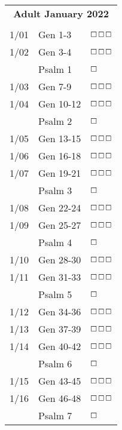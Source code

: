 \documentclass[10pt,landscape,letterpaper]{article}
\begin{document}
\begin{multicols}{5}
\begin{tabular}{p{0.15in}p{0.7in}p{0.5in}}
\multicolumn{3}{c}{\textbf{Adult January 2022}} \\
& & \\
1/01 & Gen 1-3 & $\boxempty$$\boxempty$$\boxempty$ \\
1/02 & Gen 3-4 & $\boxempty$$\boxempty$$\boxempty$ \\
 & \textcolor[rgb]{0.98,0.00,0.00}{Psalm 1} & \textcolor[rgb]{1.00,0.00,0.00}{$\boxempty$} \\
1/03 & Gen 7-9 & $\boxempty$$\boxempty$$\boxempty$ \\
1/04 & Gen 10-12 & $\boxempty$$\boxempty$$\boxempty$ \\
 & \textcolor[rgb]{0.98,0.00,0.00}{Psalm 2} & \textcolor[rgb]{1.00,0.00,0.00}{$\boxempty$} \\
1/05 & Gen 13-15 & $\boxempty$$\boxempty$$\boxempty$ \\
1/06 & Gen 16-18 & $\boxempty$$\boxempty$$\boxempty$ \\
1/07 & Gen 19-21 & $\boxempty$$\boxempty$$\boxempty$ \\
 & \textcolor[rgb]{0.98,0.00,0.00}{Psalm 3} & \textcolor[rgb]{1.00,0.00,0.00}{$\boxempty$} \\
1/08 & Gen 22-24 & $\boxempty$$\boxempty$$\boxempty$ \\
1/09 & Gen 25-27 & $\boxempty$$\boxempty$$\boxempty$ \\
 & \textcolor[rgb]{0.98,0.00,0.00}{Psalm 4} & \textcolor[rgb]{1.00,0.00,0.00}{$\boxempty$} \\
1/10 & Gen 28-30 & $\boxempty$$\boxempty$$\boxempty$ \\
1/11 & Gen 31-33 & $\boxempty$$\boxempty$$\boxempty$ \\
 & \textcolor[rgb]{0.98,0.00,0.00}{Psalm 5} & \textcolor[rgb]{1.00,0.00,0.00}{$\boxempty$} \\
1/12 & Gen 34-36 & $\boxempty$$\boxempty$$\boxempty$ \\
1/13 & Gen 37-39 & $\boxempty$$\boxempty$$\boxempty$ \\
1/14 & Gen 40-42 & $\boxempty$$\boxempty$$\boxempty$ \\
 & \textcolor[rgb]{0.98,0.00,0.00}{Psalm 6} & \textcolor[rgb]{1.00,0.00,0.00}{$\boxempty$} \\
1/15 & Gen 43-45 & $\boxempty$$\boxempty$$\boxempty$ \\
1/16 & Gen 46-48 & $\boxempty$$\boxempty$$\boxempty$ \\
 & \textcolor[rgb]{0.98,0.00,0.00}{Psalm 7} & \textcolor[rgb]{1.00,0.00,0.00}{$\boxempty$} \\

\end{tabular}
\end{multicols}
\end{document}
